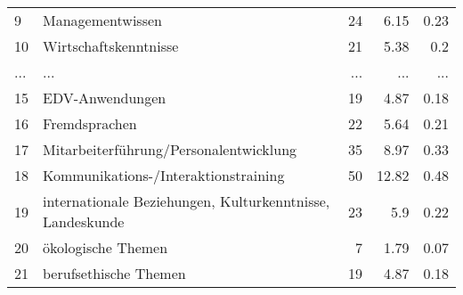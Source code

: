 \begin{longtable}{lXrrr}
        9 & \multicolumn{1}{X}{Managementwissen} & %
          \num{24} &
          \num[round-mode=places,round-precision=2]{6,15} &
          \num[round-mode=places,round-precision=2]{0,23} \\
        10 & \multicolumn{1}{X}{Wirtschaftskenntnisse} & %
          \num{21} &
          \num[round-mode=places,round-precision=2]{5,38} &
          \num[round-mode=places,round-precision=2]{0,2} \\
       ... & ... & ... & ... & ... \\
        15 & \multicolumn{1}{X}{EDV-Anwendungen} & %
          \num{19} &
          \num[round-mode=places,round-precision=2]{4,87} &
          \num[round-mode=places,round-precision=2]{0,18} \\

        16 & \multicolumn{1}{X}{Fremdsprachen} & %
          \num{22} &
          \num[round-mode=places,round-precision=2]{5,64} &
          \num[round-mode=places,round-precision=2]{0,21} \\

        17 & \multicolumn{1}{X}{Mitarbeiterführung/Personalentwicklung} & %
          \num{35} &
          \num[round-mode=places,round-precision=2]{8,97} &
          \num[round-mode=places,round-precision=2]{0,33} \\

        18 & \multicolumn{1}{X}{Kommunikations-/Interaktionstraining} & %
          \num{50} &
          \num[round-mode=places,round-precision=2]{12,82} &
          \num[round-mode=places,round-precision=2]{0,48} \\

        19 & \multicolumn{1}{X}{internationale Beziehungen, Kulturkenntnisse, Landeskunde} & %
          \num{23} &
          \num[round-mode=places,round-precision=2]{5,9} &
          \num[round-mode=places,round-precision=2]{0,22} \\

        20 & \multicolumn{1}{X}{ökologische Themen} & %
          \num{7} &
          \num[round-mode=places,round-precision=2]{1,79} &
          \num[round-mode=places,round-precision=2]{0,07} \\

        21 & \multicolumn{1}{X}{berufsethische Themen} & %
          \num{19} &
          \num[round-mode=places,round-precision=2]{4,87} &
          \num[round-mode=places,round-precision=2]{0,18} \\


\end{longtable}
